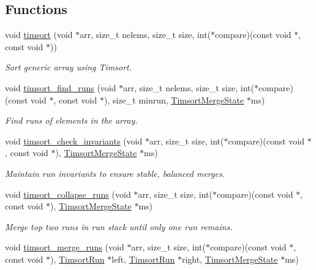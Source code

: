 \subsection*{Functions}
\begin{DoxyCompactItemize}
\item 
void \hyperlink{group__Timsort_ga1c9fca70060e37617156b89b387aa4d3}{timsort} (void $\ast$arr, size\+\_\+t nelems, size\+\_\+t size, int($\ast$compare)(const void $\ast$, const void $\ast$))
\begin{DoxyCompactList}\small\item\em Sort generic array using Timsort. \end{DoxyCompactList}\item 
void \hyperlink{group__Timsort_ga17b4bb9f7e1875e9e9e4c250b5b83482}{timsort\+\_\+find\+\_\+runs} (void $\ast$arr, size\+\_\+t nelems, size\+\_\+t size, int($\ast$compare)(const void $\ast$, const void $\ast$), size\+\_\+t minrun, \hyperlink{structTimsortMergeState}{Timsort\+Merge\+State} $\ast$ms)
\begin{DoxyCompactList}\small\item\em Find runs of elements in the array. \end{DoxyCompactList}\item 
void \hyperlink{group__Timsort_ga739626860caf26ad6fbe52f9dcb0806c}{timsort\+\_\+check\+\_\+invariants} (void $\ast$arr, size\+\_\+t size, int($\ast$compare)(const void $\ast$, const void $\ast$), \hyperlink{structTimsortMergeState}{Timsort\+Merge\+State} $\ast$ms)
\begin{DoxyCompactList}\small\item\em Maintain run invariants to ensure stable, balanced merges. \end{DoxyCompactList}\item 
void \hyperlink{group__Timsort_gaf7991b9ef4ee31db5ae9f1fba5c04a15}{timsort\+\_\+collapse\+\_\+runs} (void $\ast$arr, size\+\_\+t size, int($\ast$compare)(const void $\ast$, const void $\ast$), \hyperlink{structTimsortMergeState}{Timsort\+Merge\+State} $\ast$ms)
\begin{DoxyCompactList}\small\item\em Merge top two runs in run stack until only one run remains. \end{DoxyCompactList}\item 
void \hyperlink{group__Timsort_ga08929ad9e29cde3f24660fef3b08191c}{timsort\+\_\+merge\+\_\+runs} (void $\ast$arr, size\+\_\+t size, int($\ast$compare)(const void $\ast$, const void $\ast$), \hyperlink{structTimsortRun}{Timsort\+Run} $\ast$left, \hyperlink{structTimsortRun}{Timsort\+Run} $\ast$right, \hyperlink{structTimsortMergeState}{Timsort\+Merge\+State} $\ast$ms)

\end{DoxyCompactItemize}
